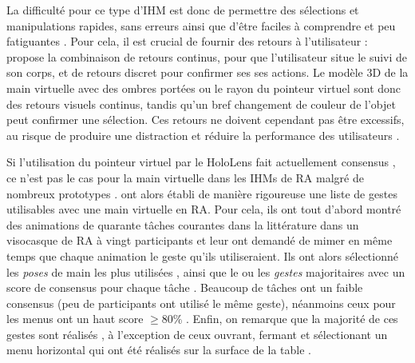 La difficulté pour ce type d'IHM est donc de permettre des sélections et manipulations rapides, sans erreurs ainsi que d'être faciles à comprendre et peu fatiguantes \citep{Argelaguet2013}. Pour cela, il est crucial de fournir des retours à l'utilisateur : \cite{Chan2010} propose la combinaison de retours continus, pour que l'utilisateur situe le suivi de son corps, et de retours discret pour confirmer ses ses actions. Le modèle 3D de la main virtuelle avec des ombres portées ou le rayon du pointeur virtuel sont donc des retours visuels continus, tandis qu'un bref changement de couleur de l'objet peut confirmer une sélection. Ces retours ne doivent cependant pas être excessifs, au risque de produire une distraction et réduire la performance des utilisateurs \citep{Argelaguet2013}.



Si l'utilisation du pointeur virtuel par le HoloLens fait actuellement consensus \citep{Kitoe2018}, ce n'est pas le cas pour la main virtuelle dans les IHMs de RA malgré de nombreux prototypes \citep{Piumsomboon2013}. \citeauthor{Piumsomboon2013} ont alors établi de manière rigoureuse une liste de gestes utilisables avec une main virtuelle en RA. Pour cela, ils ont tout d'abord montré des animations de quarante tâches courantes dans la littérature dans un visocasque de RA à vingt participants et leur ont demandé de mimer en même temps que chaque animation le geste qu'ils utiliseraient. Ils ont alors sélectionné les \emph{poses} de main les plus utilisées , ainsi que le ou les \emph{gestes} majoritaires avec un score de consensus pour chaque tâche . Beaucoup de tâches ont un faible consensus (peu de participants ont utilisé le même geste), néanmoins ceux pour les menus ont un haut score $\geq 80\%$ . Enfin, on remarque que la majorité de ces gestes sont réalisés , à l'exception de ceux ouvrant, fermant et sélectionant un menu horizontal qui ont été réalisés sur la surface de la table .

